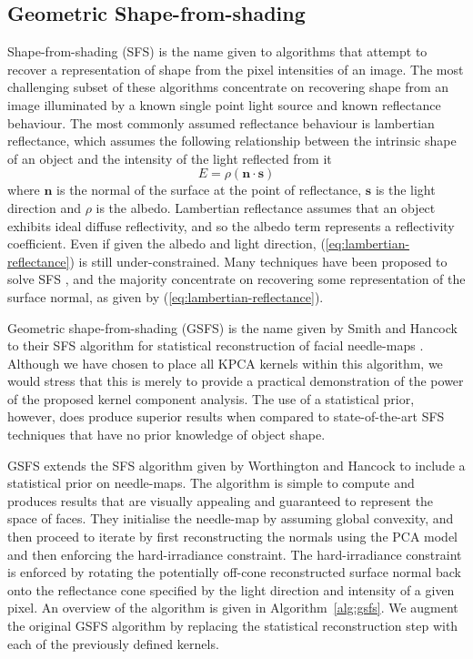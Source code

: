 \subsection{Geometric Shape-from-shading}\label{subsec:gsfs}
Shape-from-shading (SFS) is the name given to algorithms that attempt to recover a representation of shape from the pixel intensities of an image. The most challenging subset of these algorithms concentrate on recovering shape from an image illuminated by a known single point light source and known reflectance behaviour. The most commonly assumed reflectance behaviour is lambertian reflectance, which assumes the following relationship between the intrinsic shape of an object and the intensity of the light reflected from it
\begin{equation}\label{eq:lambertian-reflectance}
    E = \rho (\boldsymbol{n} \cdot \boldsymbol{s})
\end{equation}
where $\boldsymbol{n}$ is the normal of the surface at the point of reflectance, $\boldsymbol{s}$ is the light direction and $\rho$ is the albedo. Lambertian reflectance assumes that an object exhibits ideal diffuse reflectivity, and so the albedo term represents a reflectivity coefficient. Even if given the albedo and light direction, (\ref{eq:lambertian-reflectance}) is still under-constrained. Many techniques have been proposed to solve SFS \cite{RefWorks:249, RefWorks:225, RefWorks:270}, and the majority concentrate on recovering some representation of the surface normal, as given by (\ref{eq:lambertian-reflectance}).

Geometric shape-from-shading (GSFS) is the name given by Smith and Hancock to their SFS algorithm for statistical reconstruction of facial needle-maps \cite{RefWorks:86, RefWorks:90}. Although we have chosen to place all KPCA kernels within this algorithm, we would stress that this is merely to provide a practical demonstration of the power of the proposed kernel component analysis. The use of a statistical prior, however, does produce superior results when compared to state-of-the-art SFS techniques that have no prior knowledge of object shape.

GSFS extends the SFS algorithm given by Worthington and Hancock \cite{RefWorks:252} to include a statistical prior on needle-maps. The algorithm is simple to compute and produces results that are visually appealing and guaranteed to represent the space of faces. They initialise the needle-map by assuming global convexity, and then proceed to iterate by first reconstructing the normals using the PCA model and then enforcing the hard-irradiance constraint. The hard-irradiance constraint is enforced by rotating the potentially off-cone reconstructed surface normal back onto the reflectance cone specified by the light direction and intensity of a given pixel. An overview of the algorithm is given in Algorithm~\ref{alg:gsfs}. We augment the original GSFS algorithm by replacing the statistical reconstruction step with each of the previously defined kernels.


